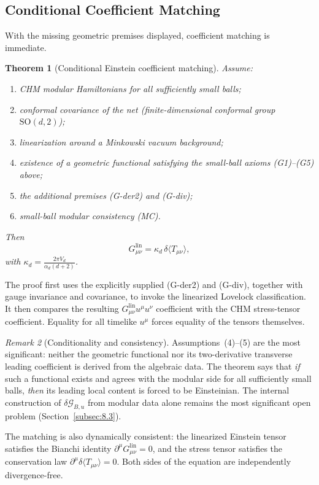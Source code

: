 \documentclass[12pt]{article}
\newtheorem{theorem}{Theorem}[section]
\theoremstyle{definition}
\theoremstyle{remark}
\newtheorem{remark}[theorem]{Remark}
\begin{document}
\subsection{Conditional Coefficient Matching}\label{subsec:4.3}

With the missing geometric premises displayed, coefficient matching is
immediate.

\begin{theorem}[Conditional Einstein coefficient matching]\label{thm:II.4}
Assume:
\begin{enumerate}
\item CHM modular Hamiltonians for all sufficiently small balls;
\item conformal covariance of the net (finite-dimensional conformal group \(\mathrm{SO}(d,2)\));
\item linearization around a Minkowski vacuum background;
\item existence of a geometric functional satisfying the small-ball axioms (G1)--(G5) above;
\item the additional premises (G-der2) and (G-div);
\item small-ball modular consistency (MC).
\end{enumerate}
Then
\[
G^{\mathrm{lin}}_{\mu\nu}
=
\kappa_d\,
\delta\langle T_{\mu\nu}\rangle,
\]
with \(\kappa_d = \frac{2\pi V_d}{\alpha_d(d+2)}\).
\end{theorem}

The proof first uses the explicitly supplied (G-der2) and (G-div),
together with gauge invariance and covariance, to invoke the linearized
Lovelock classification. It then compares the resulting
\(G^{\mathrm{lin}}_{\mu\nu}u^\mu u^\nu\) coefficient with the CHM
stress-tensor coefficient. Equality for all timelike \(u^\mu\) forces
equality of the tensors themselves.

\begin{remark}[Conditionality and consistency]
Assumptions~(4)--(5) are the most significant: neither the geometric
functional nor its two-derivative transverse leading coefficient is
derived from the algebraic data. The theorem says that \emph{if} such a functional
exists and agrees with the modular side for all sufficiently small
balls, \emph{then} its leading local content is forced to be
Einsteinian. The internal construction of
\(\delta\mathcal{G}_{B,u}\) from modular data alone remains the most
significant open problem (Section~\ref{subsec:8.3}).

The matching is also dynamically consistent: the linearized Einstein
tensor satisfies the Bianchi identity
\(\partial^\mu G^{\mathrm{lin}}_{\mu\nu}=0\), and the stress tensor
satisfies the conservation law
\(\partial^\mu\delta\langle T_{\mu\nu}\rangle=0\). Both sides of the
equation are independently divergence-free.
\end{remark}
\end{document}
